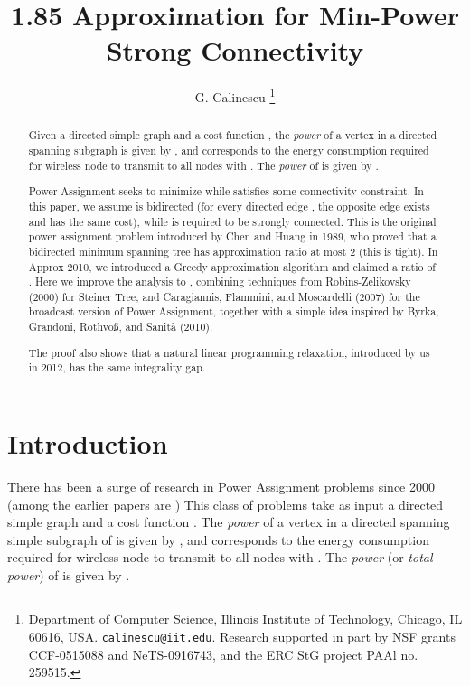 \documentclass[12pt]{article}
\begin{document}
\title{1.85 Approximation for Min-Power Strong Connectivity}
\author{ {G. Calinescu}
\thanks{Department of Computer Science,
Illinois Institute of Technology, Chicago, IL 60616, USA. 
{\tt calinescu@iit.edu}. Research supported in part by NSF grants
CCF-0515088 and NeTS-0916743, and the ERC StG project PAAl no. 259515.
}}\date{}
\maketitle




\begin{abstract}
Given a directed
simple graph  and a cost function ,
the {\em power} of a vertex  in a directed spanning subgraph  is given by
, and corresponds to the
energy consumption required for wireless node  to transmit to all nodes
 with .
The {\em power} of  is given by .

Power Assignment seeks to minimize  while 
satisfies some connectivity constraint. In this paper, we assume
 is bidirected (for every directed edge , the opposite edge exists
and has the same cost), while  is required to be strongly connected.
This is the original power assignment problem introduced by Chen and Huang
in 1989,
who proved that a bidirected minimum spanning tree
has approximation ratio at most 2 (this is tight).
In Approx 2010, we introduced a Greedy approximation algorithm 
and claimed a ratio of .  Here we improve the analysis to ,
combining techniques from Robins-Zelikovsky (2000) for Steiner Tree,
and Caragiannis, Flammini, and Moscardelli (2007) for the broadcast version
of Power Assignment, together with a simple idea inspired by
Byrka, Grandoni, Rothvo\ss, and Sanit\`{a} (2010).

The proof also shows that a natural linear programming relaxation,
introduced by us in 2012, has the same  integrality gap.
\end{abstract}

\section{Introduction}

There has been a surge of research in Power Assignment problems since 2000
(among the earlier papers are
\cite{ramanathan00topology,WLBW01,HajiaghayiIM03})
This class of problems take as input a directed
simple graph  and a cost function .
The {\em power} of a vertex  in a directed spanning simple 
subgraph  of  is given by
, and corresponds to the
energy consumption required for wireless node  to transmit to all nodes
 with .
The {\em power} (or {\em total power})
of  is given by .
\end{document}
